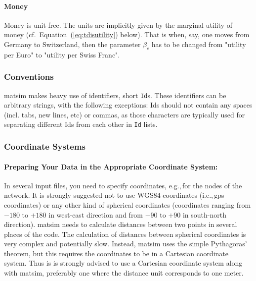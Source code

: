 \paragraph{Money}

Money is unit-free. The units are implicitly given by the marginal utility of money (cf.\ Equation~(\ref{eq:tdisutility}) below). That is when, say, one moves from Germany to Switzerland, then the parameter $\beta_c$ has to be changed from "utility per Euro" to "utility per Swiss Franc".

\subsubsection{Conventions}
\gls{matsim} makes heavy use of identifiers, short \lstinline|Id|s. These identifiers can be arbitrary strings, with the following exceptions: Ids should not contain any spaces (incl. tabs, new lines, etc) or commas, as those characters are typically used for separating different Ids from each other in \lstinline|Id| lists. 

\subsubsection{Coordinate Systems}
\label{sec:coordinatesystems}
\paragraph{Preparing Your Data in the Appropriate Coordinate System:}
In several input files, you need to specify coordinates, e.g.,\,for the nodes of the network. It is strongly suggested not to use WGS84 coordinates (i.e.,\,\gls{gps} coordinates) or any other kind of spherical coordinates (coordinates ranging from $-180$ to $+180$ in west-east direction and from $-90$ to $+90$ in south-north direction). \gls{matsim} needs to calculate distances between two points in several places of the code. The calculation of distances between spherical coordinates is very complex and potentially slow. Instead, \gls{matsim} uses the simple Pythagoras' theorem, but this requires the coordinates to be in a Cartesian coordinate system. Thus is is strongly advised to use a Cartesian coordinate system along with \gls{matsim}, preferably one where the distance unit corresponds to one meter.

